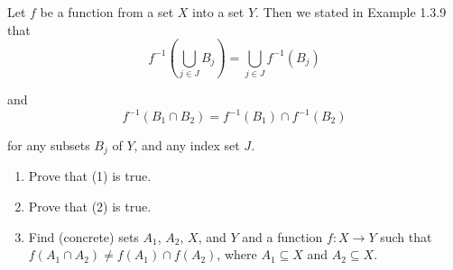\begin{exercise}
    Let $f$ be a function from a set $X$ into a set $Y$. Then we stated in {\color{blue}Example 1.3.9} that
    \begin{equation*}
        f^{-1}\left(\bigcup_{j\in J} B_{j}\right) = \bigcup_{j\in J} f^{-1}(B_{j}) \tag{1}
    \end{equation*}

    and
    \begin{equation*}
        f^{-1}\left(B_{1}\cap B_{2}\right) = f^{-1}(B_{1}) \cap f^{-1}(B_{2}) \tag{2}
    \end{equation*}

    for any subsets $B_{j}$ of $Y$, and any index set $J$.
    \begin{enumerate}[label={(\alph*)}]
        \item Prove that (1) is true.
        \item Prove that (2) is true.
        \item Find (concrete) sets $A_{1}$, $A_{2}$, $X$, and $Y$ and a function $f: X\to Y$ such that $f(A_{1}\cap A_{2}) \ne f(A_{1})\cap f(A_{2})$, where $A_{1}\subseteq X$ and $A_{2}\subseteq X$.
    \end{enumerate}
\end{exercise}

